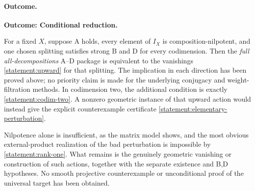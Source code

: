 \documentclass[11pt]{article}
\begin{document}
\paragraph{Outcome.}
\textbf{Outcome: Conditional reduction.}

For a fixed $X$, suppose A holds, every element of $I_X$ is composition-nilpotent,
and one chosen splitting satisfies strong B and D for every codimension.
Then the \emph{full all-decompositions} A--D package is equivalent to the
vanishings \eqref{statement:upward} for that splitting.  The implication in each
direction has been proved above; no priority claim is made for the underlying
conjugacy and weight-filtration methods.  In codimension two, the additional
condition is exactly \eqref{statement:codim-two}.  A nonzero geometric instance of
that upward action would instead give the explicit counterexample certificate
\eqref{statement:elementary-perturbation}.

Nilpotence alone is insufficient, as the matrix model shows, and the most
obvious external-product realization of the bad perturbation is impossible
by \eqref{statement:rank-one}.  What remains is the genuinely geometric vanishing
or construction of such actions, together with the separate existence and
B,D hypotheses.  No smooth projective counterexample or unconditional proof
of the universal target has been obtained.
\end{document}
